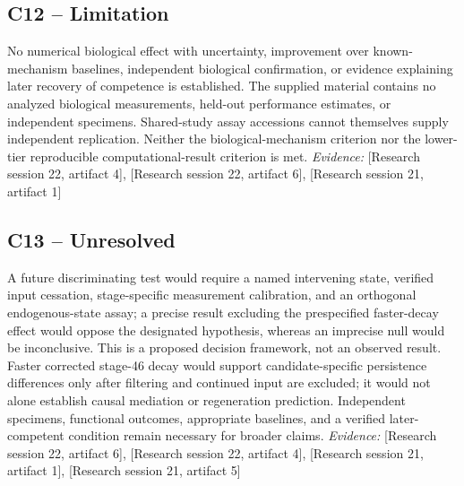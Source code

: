 \documentclass[11pt]{article}
\begin{document}
\begin{sloppypar}
\subsection{C12 -- Limitation}
No numerical biological effect with uncertainty, improvement over known-mechanism baselines, independent biological confirmation, or evidence explaining later recovery of competence is established.
The supplied material contains no analyzed biological measurements, held-out performance estimates, or independent specimens. Shared-study assay accessions cannot themselves supply independent replication. Neither the biological-mechanism criterion nor the lower-tier reproducible computational-result criterion is met.
\textit{Evidence: }[Research session 22, artifact 4], [Research session 22, artifact 6], [Research session 21, artifact 1]
\subsection{C13 -- Unresolved}
A future discriminating test would require a named intervening state, verified input cessation, stage-specific measurement calibration, and an orthogonal endogenous-state assay; a precise result excluding the prespecified faster-decay effect would oppose the designated hypothesis, whereas an imprecise null would be inconclusive.
This is a proposed decision framework, not an observed result. Faster corrected stage-46 decay would support candidate-specific persistence differences only after filtering and continued input are excluded; it would not alone establish causal mediation or regeneration prediction. Independent specimens, functional outcomes, appropriate baselines, and a verified later-competent condition remain necessary for broader claims.
\textit{Evidence: }[Research session 22, artifact 6], [Research session 22, artifact 4], [Research session 21, artifact 1], [Research session 21, artifact 5]
\end{sloppypar}
\end{document}
